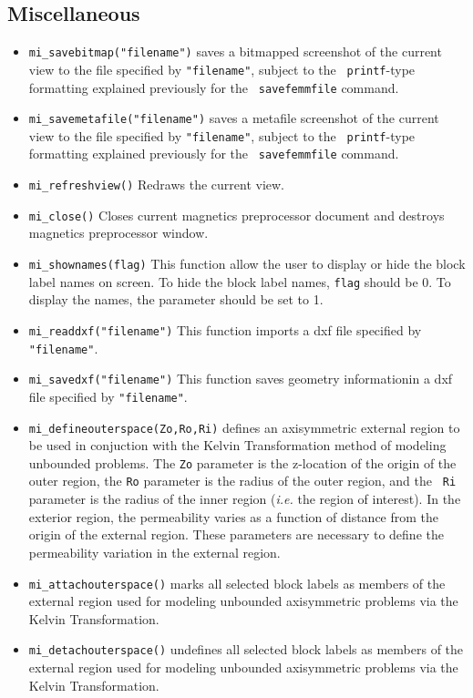 \subsection{Miscellaneous}
\begin{itemize}
\item{\tt mi\_savebitmap("filename")} saves a bitmapped screenshot of the current
view to the file specified by {\tt "filename"}, subject to the {\tt
printf}-type formatting explained previously for the {\tt
savefemmfile} command.
\item{\tt mi\_savemetafile("filename")} saves a metafile screenshot of the current
view to the file specified by {\tt "filename"}, subject to the {\tt
printf}-type formatting explained previously for the {\tt
savefemmfile} command.
\item{\tt mi\_refreshview()} Redraws the current view.
\item{\tt mi\_close()} Closes current magnetics preprocessor
document and destroys magnetics preprocessor window.
\item{\tt mi\_shownames(flag)} This function allow the user to display or hide the block label
names on screen.  To hide the block label names, {\tt flag} should be 0.  To display the
names, the parameter should be set to 1.
\item{\tt mi\_readdxf("filename")} This function imports a dxf file specified by {\tt "filename"}.
\item{\tt mi\_savedxf("filename")} This function saves geometry informationin a dxf file specified by {\tt "filename"}.
\item{\tt mi\_defineouterspace(Zo,Ro,Ri)} defines
an axisymmetric external region to be used in conjuction with the
Kelvin Transformation method of modeling unbounded problems.  The
{\tt Zo} parameter is the z-location of the origin of the outer region,
the {\tt Ro} parameter is the radius of the outer region, and the {\tt
Ri} parameter is the radius of the inner region ({\em i.e.} the region of
interest). In the exterior region, the permeability varies as a function of
distance from the origin of the external region.  These parameters
are necessary to define the permeability variation in the external
region.
\item{\tt mi\_attachouterspace()} marks all
selected block labels as members of the external region used for
modeling unbounded axisymmetric problems via the Kelvin
Transformation.
\item{\tt mi\_detachouterspace()} undefines all selected block labels
as members of the external region used for modeling unbounded axisymmetric
problems via the Kelvin Transformation.


\end{itemize}

